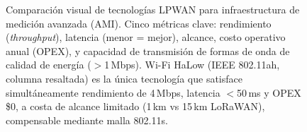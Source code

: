 \begin{figure}[ht]
{%
}%
\caption{Comparaci\'{o}n visual de tecnolog\'{i}as LPWAN para infraestructura de medici\'{o}n avanzada (AMI). Cinco m\'{e}tricas clave: rendimiento (\textit{throughput}), latencia (menor = mejor), alcance, costo operativo anual (OPEX), y capacidad de transmisi\'{o}n de formas de onda de calidad de energ\'{i}a ($>$1\,Mbps). Wi-Fi HaLow (IEEE 802.11ah, columna resaltada) es la \'{u}nica tecnolog\'{i}a que satisface simult\'{a}neamente rendimiento de 4\,Mbps, latencia $<$50\,ms y OPEX \$0, a costa de alcance limitado (1\,km vs 15\,km LoRaWAN), compensable mediante malla 802.11s.}
\label{fig:lpwan-comparison}
\end{figure}
